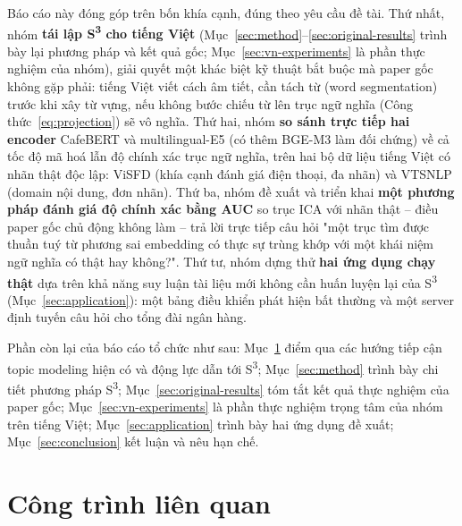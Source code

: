 \documentclass[11pt]{article}
\begin{document}
Báo cáo này đóng góp trên bốn khía cạnh, đúng theo yêu cầu đề tài. Thứ
nhất, nhóm \textbf{tái lập S\textsuperscript{3} cho tiếng Việt}
(Mục~\ref{sec:method}--\ref{sec:original-results} trình bày lại phương
pháp và kết quả gốc; Mục~\ref{sec:vn-experiments} là phần thực nghiệm của
nhóm), giải quyết một khác biệt kỹ thuật bắt buộc mà paper gốc không gặp
phải: tiếng Việt viết cách âm tiết, cần tách từ (word segmentation) trước
khi xây từ vựng, nếu không bước chiếu từ lên trục ngữ nghĩa
(Công thức~\ref{eq:projection}) sẽ vô nghĩa. Thứ hai, nhóm \textbf{so sánh
trực tiếp hai encoder} CafeBERT và multilingual-E5 (có thêm BGE-M3 làm đối
chứng) về cả tốc độ mã hoá lẫn độ chính xác trục ngữ nghĩa, trên hai bộ dữ
liệu tiếng Việt có nhãn thật độc lập: ViSFD (khía cạnh đánh giá điện
thoại, đa nhãn) và VTSNLP (domain nội dung, đơn nhãn). Thứ ba, nhóm đề
xuất và triển khai \textbf{một phương pháp đánh giá độ chính xác bằng
AUC} so trục ICA với nhãn thật -- điều paper gốc chủ động không làm -- trả
lời trực tiếp câu hỏi "một trục tìm được thuần tuý từ phương sai embedding
có thực sự trùng khớp với một khái niệm ngữ nghĩa có thật hay không?".
Thứ tư, nhóm dựng thử \textbf{hai ứng dụng chạy thật} dựa trên khả năng
suy luận tài liệu mới không cần huấn luyện lại của S\textsuperscript{3}
(Mục~\ref{sec:application}): một bảng điều khiển phát hiện bất thường và
một server định tuyến câu hỏi cho tổng đài ngân hàng.

Phần còn lại của báo cáo tổ chức như sau: Mục~\ref{sec:related-work} điểm
qua các hướng tiếp cận topic modeling hiện có và động lực dẫn tới
S\textsuperscript{3}; Mục~\ref{sec:method} trình bày chi tiết phương pháp
S\textsuperscript{3}; Mục~\ref{sec:original-results} tóm tắt kết quả thực
nghiệm của paper gốc; Mục~\ref{sec:vn-experiments} là phần thực nghiệm
trọng tâm của nhóm trên tiếng Việt; Mục~\ref{sec:application} trình bày
hai ứng dụng đề xuất; Mục~\ref{sec:conclusion} kết luận và nêu hạn chế.

\section{Công trình liên quan}
\label{sec:related-work}
\end{document}
